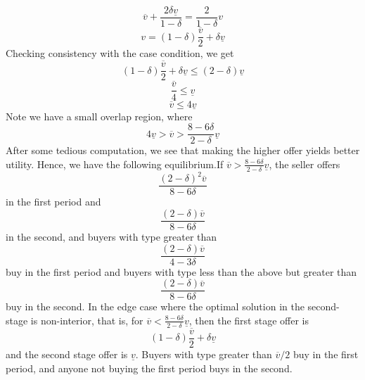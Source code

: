 \documentclass[10pt,letter]{article}
\begin{document}
\begin{enumerate}[label=(\alph*)]
\[ \overline{v} + \frac{2\delta\underline{v}}{1-\delta} = \frac{2}{1-\delta}v \]
\[ v = (1-\delta)\frac{\overline{v}}{2} + \delta\underline{v} \]
Checking consistency with the case condition, we get
\[ (1-\delta)\frac{\overline{v}}{2} + \delta\underline{v} \le (2-\delta) \underline{v}\]
\[ \frac{\overline{v}}{4} \le \underline{v}\]
\[ \overline{v}\le 4\underline{v}\]
Note we have a small overlap region, where
\[ 4 \underline{v} >\overline{v} >\frac{8 - 6\delta}{2-\delta}\underline{v}\]
After some tedious computation, we see that making the higher offer yields better utility. Hence, we have the following equilibrium.If $\overline{v} >\frac{8 - 6\delta}{2-\delta}\underline{v}$, the seller offers
\[ \frac{(2-\delta)^2 \overline{v} }{8 - 6 \delta} \]
in the first period and
\[ \frac{(2-\delta) \overline{v} }{8 - 6 \delta} \]
in the second, and buyers with type greater than
\[ \frac{(2-\delta) \overline{v} }{4 - 3 \delta} \]
buy in the first period and buyers with type less than the above but greater than
\[ \frac{(2-\delta) \overline{v} }{8 - 6 \delta} \]
buy in the second. In the edge case where the optimal solution in the second-stage is non-interior, that is, for $\overline{v} < \frac{8 - 6\delta}{2-\delta}\underline{v}$, then the first stage offer is
\[ (1-\delta)\frac{\overline{v}}{2} + \delta\underline{v} \]
and the second stage offer is $\underline{v}$. Buyers with type greater than $\overline{v}/2$ buy in the first period, and anyone not buying the first period buys in the second.

\end{enumerate}
\end{document}
